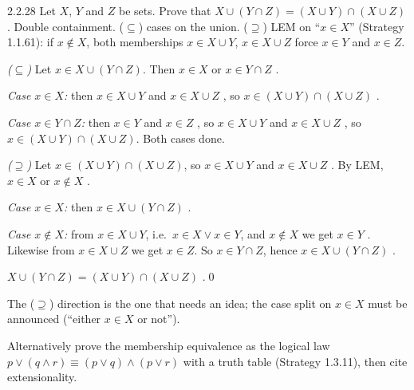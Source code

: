 \begin{bookex}[essential]{2.2.28}
Let $X$, $Y$ and $Z$ be sets. Prove that $X\cup(Y\cap Z)=(X\cup Y)\cap(X\cup Z)$.
\solution
\plan Double containment. ($\subseteq$) cases on the union. ($\supseteq$) LEM on ``$x\in X$'' (Strategy 1.1.61): if $x\notin X$, both memberships $x\in X\cup Y$, $x\in X\cup Z$ force $x\in Y$ and $x\in Z$.
\begin{steps}
\item \emph{($\subseteq$)} Let $x\in X\cup(Y\cap Z)$. Then $x\in X$ or $x\in Y\cap Z$ .
\item \emph{Case $x\in X$:} then $x\in X\cup Y$ and $x\in X\cup Z$ , so $x\in(X\cup Y)\cap(X\cup Z)$ .
\item \emph{Case $x\in Y\cap Z$:} then $x\in Y$ and $x\in Z$ , so $x\in X\cup Y$ and $x\in X\cup Z$ , so $x\in(X\cup Y)\cap(X\cup Z)$. Both cases done.
\item \emph{($\supseteq$)} Let $x\in(X\cup Y)\cap(X\cup Z)$, so $x\in X\cup Y$ and $x\in X\cup Z$ . By LEM, $x\in X$ or $x\notin X$ .
\item \emph{Case $x\in X$:} then $x\in X\cup(Y\cap Z)$ .
\item \emph{Case $x\notin X$:} from $x\in X\cup Y$, i.e.\ $x\in X\vee x\in Y$, and $x\notin X$ we get $x\in Y$ . Likewise from $x\in X\cup Z$ we get $x\in Z$. So $x\in Y\cap Z$, hence $x\in X\cup(Y\cap Z)$ .
\end{steps}
\conclusion $X\cup(Y\cap Z)=(X\cup Y)\cap(X\cup Z)$ .\qed
\begin{compare}
\item The ($\supseteq$) direction is the one that needs an idea; the case split on $x\in X$ must be announced (``either $x\in X$ or not'').
\item Alternatively prove the membership equivalence as the logical law $p\vee(q\wedge r)\equiv(p\vee q)\wedge(p\vee r)$ with a truth table (Strategy 1.3.11), then cite extensionality.
\end{compare}
\end{bookex}

